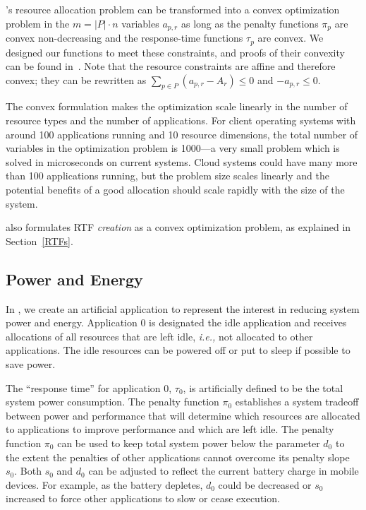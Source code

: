 \pacora's resource allocation problem can be transformed into a convex
optimization problem in the $m = |P|\cdot n$ variables $a_{p,r}$ as
long as the penalty functions $\pi_p$ are convex non-decreasing and
the response-time functions $\tau_p$ are convex.  We designed our
functions to meet these constraints, and proofs of their convexity can
be found in~\cite{pacora_tr}.
Note that the resource constraints
are affine and therefore convex; they can be rewritten as $\sum_{p\in
  P} (a_{p,r} - A_r) \leq 0$ and $-a_{p,r} \leq 0$.

The convex formulation makes the optimization scale linearly in the
number of resource types and the number of applications.  For client
operating systems with around 100 applications running and 10 resource
dimensions, the total number of variables in the optimization problem
is 1000---a very small problem which is solved in microseconds on
current systems.  Cloud systems could have many more than 100
applications running, but the problem size scales linearly and the
potential benefits of a good allocation should scale rapidly with the
size of the system.

\pacora also formulates RTF \emph{creation} as a convex optimization
problem, as explained in Section~\ref{RTFs}.

\subsection{Power and Energy}
In \pacora, we create an artificial application to represent the
interest in reducing system power and energy.  Application 0 is
designated the idle application and receives allocations of all
resources that are left idle, \emph{i.e.,} not allocated to other
applications.  The idle resources can be powered off or put to sleep
if possible to save power.

The ``response time'' for application 0, $\tau_0$, is artificially
defined to be the total system power consumption.
The penalty function $\pi_0$ establishes a system tradeoff between
power and performance that will determine which resources are
allocated to applications to improve performance and which are left
idle.  The penalty function $\pi_0$ can be used to keep total system
power below the parameter $d_0$ to the extent the penalties of other
applications cannot overcome its penalty slope $s_0$. Both $s_0$ and
$d_0$ can be adjusted to reflect the current battery charge in mobile
devices. For example, as the battery depletes, $d_0$ could be decreased or $s_0$ increased
to force other applications to slow or cease execution.

